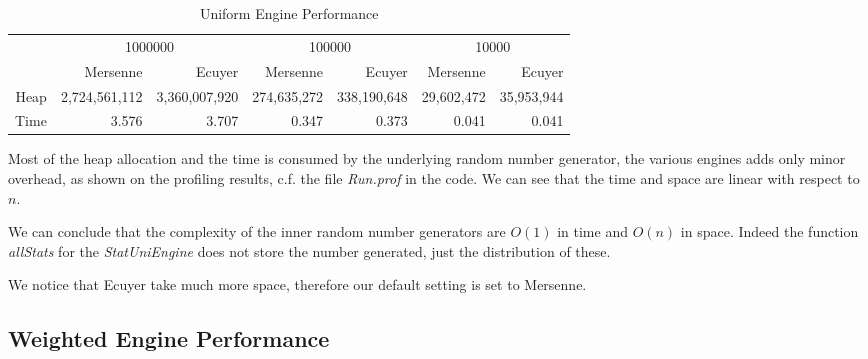 \documentclass[12pt,a4paper,article]{memoir} %
\begin{document}
\begin{table}[htbp!]
  \centering \tiny
    \begin{tabular}{r|rrrrrr}
    \multicolumn{1}{r}{} & \multicolumn{2}{c}{1000000} & \multicolumn{2}{c}{100000} & \multicolumn{2}{c}{10000} \\
    \multicolumn{1}{r}{} & Mersenne & Ecuyer & Mersenne & Ecuyer & Mersenne & Ecuyer \\
\cmidrule{2-7}    Heap  & 2,724,561,112 & 3,360,007,920 & 274,635,272 & 338,190,648 & 29,602,472 & 35,953,944 \\
    Time  & 3.576 & 3.707 & 0.347 & 0.373 & 0.041 & 0.041 \\
    \end{tabular}%
  \caption{Uniform Engine Performance}
  \label{tab:uni.perf}%
\end{table}%

Most of the heap allocation and the time is consumed by the underlying 
random number generator, the various engines adds only minor overhead, 
as shown on the profiling results, c.f. the file \emph{Run.prof} in the code.
We can see that the time and space are linear with respect to $n$. 

We can conclude that the complexity of the inner random number generators
are $O(1)$ in time and $O(n)$ in space. Indeed the function \emph{allStats} for the
\emph{StatUniEngine} does not store the number generated, 
just the distribution of these.

We notice that Ecuyer take much more space, therefore our default setting
is set to Mersenne.

\subsection{Weighted Engine Performance}
\end{document}
